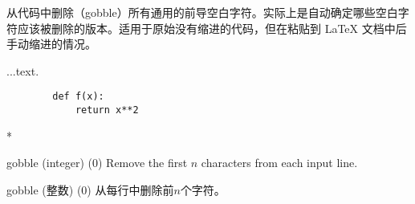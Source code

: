 \begin{optionlist}
\begin{paracol}{2}
从代码中删除（gobble）所有通用的前导空白字符。实际上是自动确定哪些空白字符应该被删除的版本。适用于原始没有缩进的代码，但在粘贴到 \LaTeX{} 文档中后手动缩进的情况。\\
\begin{example}
    ...text.
    \begin{verbatim}
        def f(x):
            return x**2
    \end{verbatim}
\end{example}
\switchcolumn[0]*%
\item[gobble (integer) (0)]
Remove the first $n$ characters from each input line.
\switchcolumn
\item[gobble (整数) (0)]
从每行中删除前$n$个字符。
\end{paracol}
\end{optionlist}
